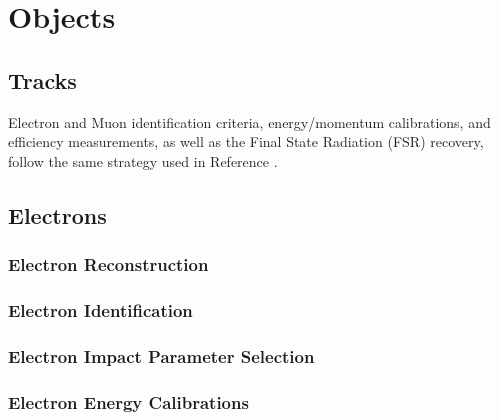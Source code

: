 

\section{Objects}
\subsection{Tracks}
\label{sec:tracks}

Electron and Muon identification criteria, energy/momentum calibrations, and efficiency measurements, as well as the Final State Radiation (FSR) recovery, follow the same strategy used in Reference . %
\subsection{Electrons}
\subsubsection{Electron Reconstruction}
\label{sec:eleReco}

\subsubsection{Electron Identification}
\label{sec:eleID}

\subsubsection{Electron Impact Parameter Selection}
\label{sec:eleSIP}

%
\subsubsection{Electron Energy Calibrations}

